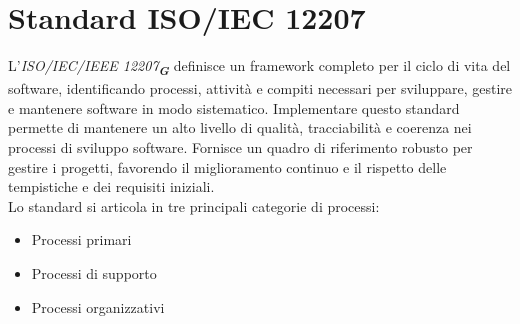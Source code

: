 

\appendix %


\section{Standard ISO/IEC 12207}
\label{sec:standard_iso-iec_12207}

L'\emph{ISO/IEC/IEEE 12207}\textsubscript{\textit{\textbf{G}}} definisce un framework completo per il ciclo di vita del software, identificando processi, attività e compiti necessari per sviluppare, gestire e mantenere software in modo sistematico. Implementare questo standard permette di mantenere un alto livello di qualità, tracciabilità e coerenza nei processi di sviluppo software. Fornisce un quadro di riferimento robusto per gestire i progetti, favorendo il miglioramento continuo e il rispetto delle tempistiche e dei requisiti iniziali.\\
Lo standard si articola in tre principali categorie di processi:
\begin{itemize}
    \item Processi primari
    \item Processi di supporto
    \item Processi organizzativi
\end{itemize}

